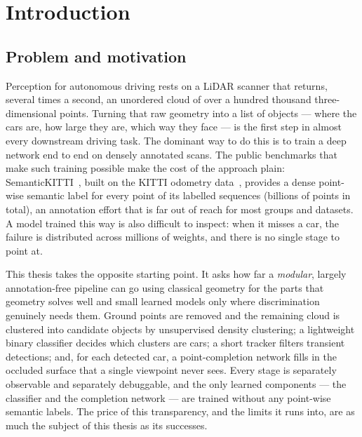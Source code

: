 \chapter{Introduction}
\label{ch:introduction}

\section{Problem and motivation}
\label{sec:intro-motivation}

Perception for autonomous driving rests on a LiDAR scanner that returns, several
times a second, an unordered cloud of over a hundred thousand three-dimensional points.
Turning that raw geometry into a list of objects --- where the cars are, how large
they are, which way they face --- is the first step in almost every downstream
driving task. The dominant way to do this is to train a deep network end to end on
densely annotated scans. The public benchmarks that make such training possible make
the cost of the approach plain: SemanticKITTI~\cite{Behley_2019_ICCV}, built on the
KITTI odometry data~\cite{geiger2012we}, provides a dense point-wise semantic label
for every point of its labelled sequences (billions of points in total), an
annotation effort that is far out of reach for most groups and datasets. A model trained this way is also
difficult to inspect: when it misses a car, the failure is distributed across
millions of weights, and there is no single stage to point at.

This thesis takes the opposite starting point. It asks how far a \emph{modular},
largely annotation-free pipeline can go using classical geometry for the parts that
geometry solves well and small learned models only where discrimination genuinely
needs them. Ground points are removed and the remaining cloud is clustered into
candidate objects by unsupervised density clustering; a lightweight binary
classifier decides which clusters are cars; a short tracker filters transient
detections; and, for each detected car, a point-completion network fills in the
occluded surface that a single viewpoint never sees. Every stage is separately
observable and separately debuggable, and the only learned components --- the
classifier and the completion network --- are trained without any point-wise
semantic labels. The price of this transparency, and the limits it runs into, are as
much the subject of this thesis as its successes.

